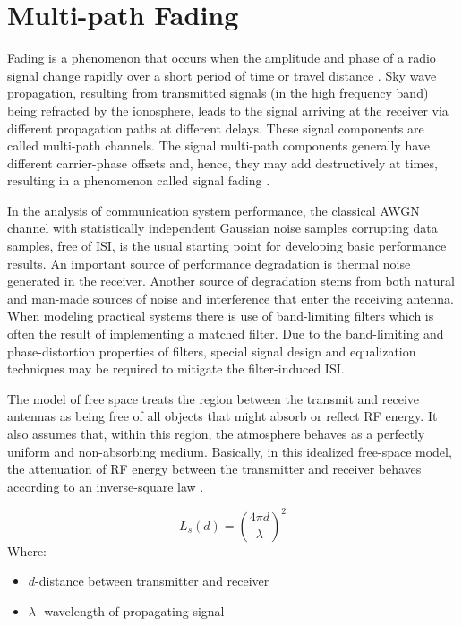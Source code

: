 \section{Multi-path Fading}
		
Fading is a phenomenon that occurs when the amplitude and phase of a radio signal change rapidly over a short period of time or travel distance \cite{fuqin}. Sky wave propagation, resulting from transmitted signals (in the high frequency band) being refracted by the ionosphere, leads to the signal arriving at the receiver via different propagation paths at different delays.
These signal components are called multi-path channels. The signal multi-path components generally have different carrier-phase offsets and, hence, they may add destructively at times, resulting in a phenomenon called signal fading \cite{Proakis}.

In the analysis of communication system performance, the classical \gls{AWGN} channel with statistically independent Gaussian noise samples corrupting data samples, free of \gls{ISI}, is the usual starting point for developing basic performance results. An important source of performance degradation is thermal noise generated in the receiver. Another source of degradation stems from both natural and man-made sources of noise and interference that enter the receiving antenna. When modeling practical systems there is use of band-limiting filters which is often the result of implementing a matched filter. Due to the band-limiting and phase-distortion properties of filters, special signal design and equalization techniques may be required to mitigate the filter-induced \gls{ISI}.

The model of free space treats the region between the transmit and receive antennas as being free of all objects that might absorb or reflect \gls{RF} energy. It also assumes that, within this region, the atmosphere behaves as a perfectly uniform and non-absorbing medium. Basically, in this idealized free-space model, the attenuation of \gls{RF} energy between the transmitter and receiver behaves according to an inverse-square law \cite{AWGN}. 

$$L_{s}(d)= \left( \frac{4\pi d}{\lambda} \right)^2$$
Where:
 \begin{itemize}
	\item $d$-distance between transmitter and receiver
	\item $\lambda$- wavelength of propagating signal
	\end{itemize}
 
